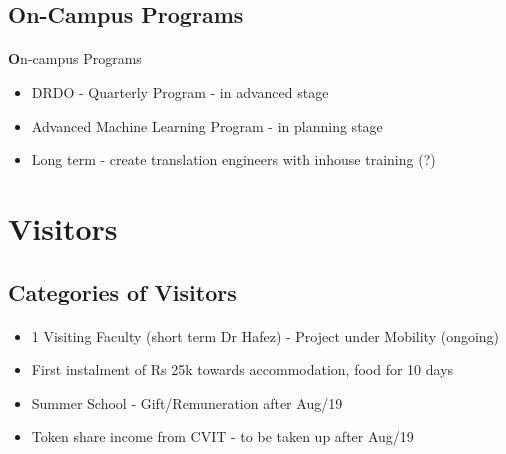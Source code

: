 \subsection{On-Campus Programs}
\begin{frame}[fragile=singleslide]{\insertsectionhead}
  \framesubtitle{\insertsubsectionhead}
  \textbf  On-campus Programs
  \begin{itemize}
    \item DRDO - Quarterly Program - in advanced stage
    \item Advanced Machine Learning Program - in planning stage
    \item  Long term - create translation engineers with inhouse training (?)
  \end{itemize}
\end{frame}

\section{Visitors}

\subsection{Categories of Visitors}
\begin{frame}[fragile=singleslide]{\insertsectionhead}
  \framesubtitle{\insertsubsectionhead}
\begin{center}
\begin{itemize}
\item 1 Visiting Faculty (short term Dr Hafez) - Project under Mobility (ongoing)
\item First instalment of Rs 25k towards accommodation, food for 10 days
\item Summer School - Gift/Remuneration after Aug/19
\item Token share income from CVIT - to be taken up after Aug/19
\end{itemize}
\end{center}
\end{frame}







